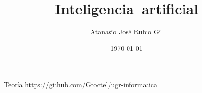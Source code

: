 \documentclass[10pt]{report}
\author{Atanasio José Rubio Gil}
\title{Inteligencia\ artificial}
\date{\today}
\begin{document}
            {Teoría}
            {https://github.com/Groctel/ugr-informatica}
\tableofcontents




\end{document}
